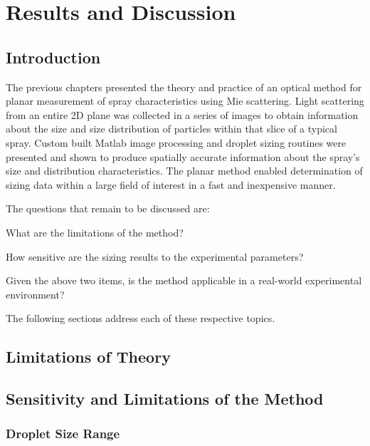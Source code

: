 \chapter{Results and Discussion}
\label{Results_and_Discussion}
\section{Introduction}

The previous chapters presented the theory and practice of an optical method for planar measurement of spray characteristics using Mie scattering.  Light scattering from an entire 2D plane was collected in a series of images to obtain information about the size and size distribution of particles within that slice of a typical spray.  Custom built Matlab image processing and droplet sizing routines were presented and shown to produce spatially accurate information about the spray's size and distribution characteristics.  The planar method enabled determination of sizing data within a large field of interest in a fast and inexpensive manner.

The questions that remain to be discussed are:
\begin{compactitem}
\item What are the limitations of the method?
\item How sensitive are the sizing results to the experimental parameters?
\item Given the above two items, is the method applicable in a real-world experimental environment? 
\end{compactitem}
\vspace*{0.15in}

The following sections address each of these respective topics.

\section{Limitations of Theory}
\label{theory_limitations}
    
%  


\section{Sensitivity and Limitations of the Method}
\label{sensitivity_analysis}

% 

 
   \subsection{Droplet Size Range}
   \label{drop_size_range}
   
